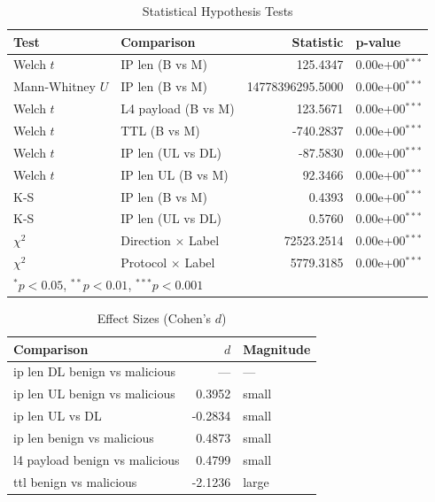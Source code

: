 \begin{table}[htbp]
\centering
\caption{Statistical Hypothesis Tests}\label{tab:tests}
\begin{tabular}{llrl}
\toprule
\textbf{Test} & \textbf{Comparison} & \textbf{Statistic} & \textbf{p-value} \\
\midrule
Welch $t$ & IP len (B vs M) & 125.4347 & 0.00e+00$^{***}$ \\
Mann-Whitney $U$ & IP len (B vs M) & 14778396295.5000 & 0.00e+00$^{***}$ \\
Welch $t$ & L4 payload (B vs M) & 123.5671 & 0.00e+00$^{***}$ \\
Welch $t$ & TTL (B vs M) & -740.2837 & 0.00e+00$^{***}$ \\
Welch $t$ & IP len (UL vs DL) & -87.5830 & 0.00e+00$^{***}$ \\
Welch $t$ & IP len UL (B vs M) & 92.3466 & 0.00e+00$^{***}$ \\
K-S & IP len (B vs M) & 0.4393 & 0.00e+00$^{***}$ \\
K-S & IP len (UL vs DL) & 0.5760 & 0.00e+00$^{***}$ \\
$\chi^2$ & Direction $\times$ Label & 72523.2514 & 0.00e+00$^{***}$ \\
$\chi^2$ & Protocol $\times$ Label & 5779.3185 & 0.00e+00$^{***}$ \\
\bottomrule
\multicolumn{4}{l}{\footnotesize $^{*}p<0.05$, $^{**}p<0.01$, $^{***}p<0.001$} \\
\end{tabular}
\end{table}

\begin{table}[htbp]
\centering
\caption{Effect Sizes (Cohen's $d$)}\label{tab:effect_sizes}
\begin{tabular}{lrl}
\toprule
\textbf{Comparison} & \textbf{$d$} & \textbf{Magnitude} \\
\midrule
ip len DL benign vs malicious & --- & --- \\
ip len UL benign vs malicious & 0.3952 & small \\
ip len UL vs DL & -0.2834 & small \\
ip len benign vs malicious & 0.4873 & small \\
l4 payload benign vs malicious & 0.4799 & small \\
ttl benign vs malicious & -2.1236 & large \\
\bottomrule
\end{tabular}
\end{table}


